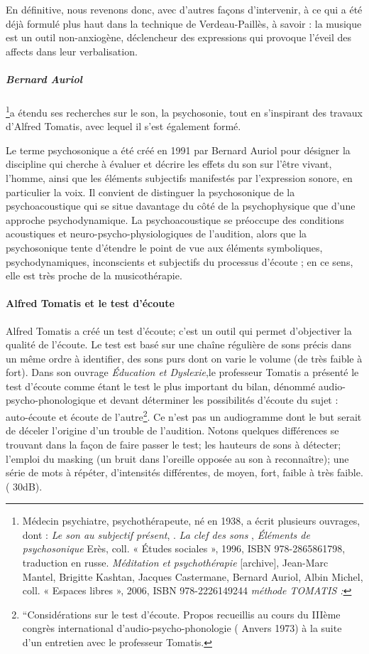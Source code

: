 En définitive, nous revenons donc, avec d'autres façons d'intervenir,
à ce qui a été déjà formulé plus haut dans la technique de Verdeau-Paillès,
à savoir : la musique est un outil non-anxiogène, déclencheur des expressions qui provoque
l'éveil des affects dans  leur verbalisation.


\subparagraph{Bernard Auriol}\footnote{Médecin psychiatre, psychothérapeute, né en
  1938, a écrit plusieurs ouvrages, dont : \emph{Le son au subjectif
    présent}, \cite{auriol96sonausubjectifpresent}.
\emph{ La clef des sons} \cite{Auri96:clesons}, \emph{Éléments de
  psychosonique} Erès, coll. « Études sociales », 1996, ISBN
978-2865861798, traduction en russe. \emph{Méditation et
  psychothérapie} {[}archive{]}, Jean-Marc Mantel, Brigitte Kashtan,
Jacques Castermane, Bernard Auriol, Albin Michel, coll. « Espaces
libres », 2006, ISBN 978-2226149244\emph{ méthode TOMATIS :} }a étendu
ses recherches sur le son, la psychosonie, tout en s'inspirant des
travaux d'Alfred Tomatis, avec lequel il s'est également formé.

Le terme psychosonique a été créé en 1991 par Bernard Auriol pour
désigner la discipline qui cherche à évaluer et décrire les effets du
son sur l'être vivant, l'homme, ainsi que les éléments
subjectifs manifestés par l'expression sonore, en particulier la voix.
Il convient de distinguer la psychosonique de la psychoacoustique qui
se situe davantage du côté de la psychophysique que d'une approche
psychodynamique. La psychoacoustique se préoccupe des conditions
acoustiques et neuro-psycho-physiologiques de l'audition, alors que la
psychosonique tente d'étendre le point de vue aux éléments
symboliques, psychodynamiques, inconscients et subjectifs du processus
d'écoute ;  en ce sens, elle est très proche de la musicothérapie.
  
\paragraph{Alfred Tomatis et le test d'écoute}
  Alfred Tomatis a créé un test d'écoute; c'est un outil qui permet d'objectiver la qualité de l'écoute.
  Le test est  basé sur une chaîne régulière de sons précis dans un même ordre à identifier, des sons purs dont on varie le volume (de très faible à fort). Dans son ouvrage \emph{Éducation et Dyslexie},le professeur Tomatis
  a présenté le test d'écoute comme étant le test le plus important du
  bilan, dénommé audio-psycho-phonologique et devant déterminer les
  possibilités d'écoute du sujet : auto-écoute et écoute de
  l'autre\footnote{``Considérations sur le test d'écoute. Propos
  	recueillis au cours du IIIème congrès international
  	d'audio-psycho-phonologie ( Anvers 1973) à la suite d'un entretien
  	avec le professeur Tomatis.}. Ce n'est pas un audiogramme dont
  le but serait de déceler l'origine d'un trouble de l'audition. Notons quelques différences se trouvant dans la façon de faire passer le test;  les hauteurs de sons à détecter; l'emploi du masking (un bruit dans l'oreille opposée
  au son à reconnaître); une série de
  mots
  à répéter, d'intensités différentes, de moyen,
  fort, faible à très faible. ( 30dB). 
  

